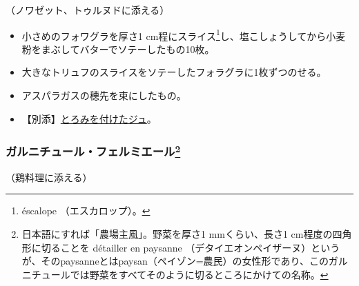 \begin{recette}


（ノワゼット、トゥルヌドに添える）

\begin{itemize}
\item
  小さめのフォワグラを厚さ1 cm程にスライス\footnote{éscalope
    （エスカロップ）。}し、塩こしょうしてから小麦粉をまぶしてバターでソテーしたもの10枚。
\item
  大きなトリュフのスライスをソテーしたフォラグラに1枚ずつのせる。
\item
  アスパラガスの穂先を束にしたもの。
\item
  【別添】\protect\hyperlink{jus-de-veau-lie}{とろみを付けたジュ}。
\end{itemize}

\atoaki{}

\hypertarget{garniture-a-la-fermiere}{%
\subsubsection[ガルニチュール・フェルミエール]{\texorpdfstring{ガルニチュール・フェルミエール\footnote{日本語にすれば「農場主風」。野菜を厚さ1
  mmくらい、長さ1 cm程度の四角形に切ることを détailler en paysanne
  （デタイエオンペイザーヌ）というが、そのpaysanneとはpaysan（ペイゾン=農民）の女性形であり、このガルニチュールでは野菜をすべてそのように切るところにかけての名称。}}{ガルニチュール・フェルミエール}}\label{garniture-a-la-fermiere}}



（鶏料理に添える）


\end{recette}
